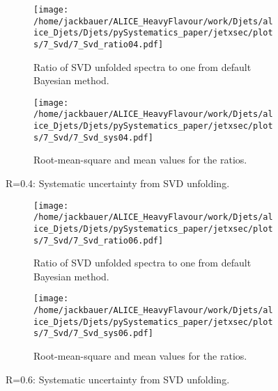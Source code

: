 \begin{figure}
\centering
\begin{subfigure}{.5\textwidth}
  \centering
  \texttt{[image: /home/jackbauer/ALICE\_HeavyFlavour/work/Djets/alice\_Djets/Djets/pySystematics\_paper/jetxsec/plots/7\_Svd/7\_Svd\_ratio04.pdf]}
  \caption{Ratio of SVD unfolded spectra to one from default Bayesian method.}
  \label{fig:sub1SVDsysUncR04}
\end{subfigure}%
\begin{subfigure}{.5\textwidth}
  \centering
  \texttt{[image: /home/jackbauer/ALICE\_HeavyFlavour/work/Djets/alice\_Djets/Djets/pySystematics\_paper/jetxsec/plots/7\_Svd/7\_Svd\_sys04.pdf]}
  \caption{Root-mean-square and mean values for the ratios.}
  \label{fig:sub2SVDsysUncR04}
\end{subfigure}
\caption{R=0.4: Systematic uncertainty from SVD unfolding.}
  \label{fig:SVDsysUncR04}
\end{figure}


\begin{figure}
\centering
\begin{subfigure}{.5\textwidth}
  \centering
  \texttt{[image: /home/jackbauer/ALICE\_HeavyFlavour/work/Djets/alice\_Djets/Djets/pySystematics\_paper/jetxsec/plots/7\_Svd/7\_Svd\_ratio06.pdf]}
  \caption{Ratio of SVD unfolded spectra to one from default Bayesian method.}
  \label{fig:sub1SVDsysUncR06}
\end{subfigure}%
\begin{subfigure}{.5\textwidth}
  \centering
  \texttt{[image: /home/jackbauer/ALICE\_HeavyFlavour/work/Djets/alice\_Djets/Djets/pySystematics\_paper/jetxsec/plots/7\_Svd/7\_Svd\_sys06.pdf]}
  \caption{Root-mean-square and mean values for the ratios.}
  \label{fig:sub2SVDsysUncR06}
\end{subfigure}
\caption{R=0.6: Systematic uncertainty from SVD unfolding.}
  \label{fig:SVDsysUncR06}
\end{figure}



